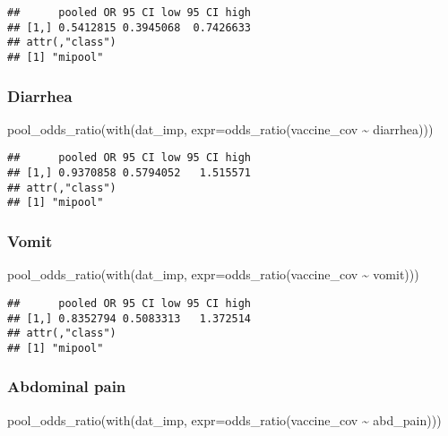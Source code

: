 \documentclass[
]{article}
\newenvironment{Shaded}{\begin{snugshade}}{\end{snugshade}}
\newcommand{\AttributeTok}[1]{\textcolor[rgb]{0.77,0.63,0.00}{#1}}
\newcommand{\FunctionTok}[1]{\textcolor[rgb]{0.00,0.00,0.00}{#1}}
\newcommand{\NormalTok}[1]{#1}
\newcommand{\SpecialCharTok}[1]{\textcolor[rgb]{0.00,0.00,0.00}{#1}}
\begin{document}
\begin{verbatim}
##      pooled OR 95 CI low 95 CI high
## [1,] 0.5412815 0.3945068  0.7426633
## attr(,"class")
## [1] "mipool"
\end{verbatim}

\hypertarget{diarrhea-1}{%
\subsubsection{Diarrhea}\label{diarrhea-1}}

\begin{Shaded}
\begin{Highlighting}[]
\FunctionTok{pool\_odds\_ratio}\NormalTok{(}\FunctionTok{with}\NormalTok{(dat\_imp, }\AttributeTok{expr=}\FunctionTok{odds\_ratio}\NormalTok{(vaccine\_cov }\SpecialCharTok{\textasciitilde{}}\NormalTok{ diarrhea))) }
\end{Highlighting}
\end{Shaded}

\begin{verbatim}
##      pooled OR 95 CI low 95 CI high
## [1,] 0.9370858 0.5794052   1.515571
## attr(,"class")
## [1] "mipool"
\end{verbatim}

\hypertarget{vomit-1}{%
\subsubsection{Vomit}\label{vomit-1}}

\begin{Shaded}
\begin{Highlighting}[]
\FunctionTok{pool\_odds\_ratio}\NormalTok{(}\FunctionTok{with}\NormalTok{(dat\_imp, }\AttributeTok{expr=}\FunctionTok{odds\_ratio}\NormalTok{(vaccine\_cov }\SpecialCharTok{\textasciitilde{}}\NormalTok{ vomit))) }
\end{Highlighting}
\end{Shaded}

\begin{verbatim}
##      pooled OR 95 CI low 95 CI high
## [1,] 0.8352794 0.5083313   1.372514
## attr(,"class")
## [1] "mipool"
\end{verbatim}

\hypertarget{abdominal-pain-1}{%
\subsubsection{Abdominal pain}\label{abdominal-pain-1}}

\begin{Shaded}
\begin{Highlighting}[]
\FunctionTok{pool\_odds\_ratio}\NormalTok{(}\FunctionTok{with}\NormalTok{(dat\_imp, }\AttributeTok{expr=}\FunctionTok{odds\_ratio}\NormalTok{(vaccine\_cov }\SpecialCharTok{\textasciitilde{}}\NormalTok{ abd\_pain))) }
\end{Highlighting}
\end{Shaded}
\end{document}
